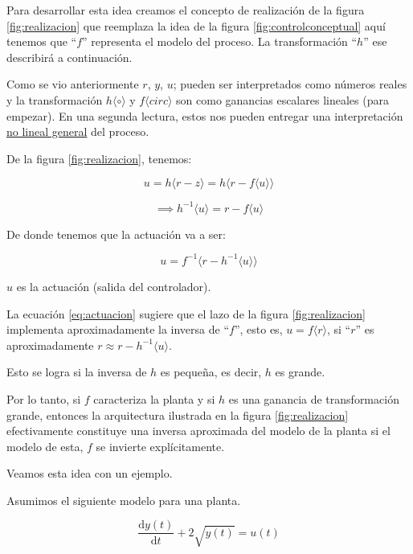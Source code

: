 \documentclass[a4paper]{article}
\begin{document}
Para desarrollar esta idea creamos el concepto de realización de la figura \ref{fig:realizacion} que reemplaza la idea de la figura \ref{fig:controlconceptual} aquí tenemos que ``$f$'' representa el modelo del proceso. La transformación ``$h$'' ese describirá a continuación.

Como se vio anteriormente $r$, $y$, $u$; pueden ser interpretados como números reales y la transformación $h\langle \circ \rangle$ y $f\langle circ \rangle$ son como ganancias escalares lineales (para empezar). En una segunda lectura, estos nos pueden entregar una interpretación \underline{no lineal general} del proceso.

De la figura \ref{fig:realizacion}, tenemos:

\begin{equation}
		u = h\langle r - z \rangle = h\langle r - f\langle u \rangle  \rangle
\end{equation}

\begin{equation}
		\implies h^{-1} \langle u \rangle = r- f\langle u \rangle
\end{equation}

De donde tenemos que la actuación va a ser:

\begin{equation}\label{eq:actuacion}
		u = f^{-1} \langle r - h^{-1}\langle u \rangle  \rangle
\end{equation}

$u$ es la actuación (salida del controlador).

La ecuación \ref{eq:actuacion} sugiere que el lazo de la figura \ref{fig:realizacion} implementa aproximadamente la inversa de ``$f$'', esto es, $u = f\langle r \rangle$, si ``$r$'' es aproximadamente $r \approx r- h^{-1} \langle u \rangle$.

Esto se logra si la inversa de $h$ es pequeña, es decir, $h$ es grande.

Por lo tanto, si $f$ caracteriza la planta y si $h$ es una ganancia de transformación grande, entonces la arquitectura ilustrada en la figura \ref{fig:realizacion} efectivamente constituye una inversa aproximada del modelo de la planta si el modelo de esta, $f$ se invierte explícitamente.

Veamos esta idea con un ejemplo.

Asumimos el siguiente modelo para una planta.

\begin{equation}
		\frac{\mathrm{d} y(t)}{\mathrm{d} t} + 2 \sqrt{y(t)} = u(t)
\end{equation}
\end{document}
